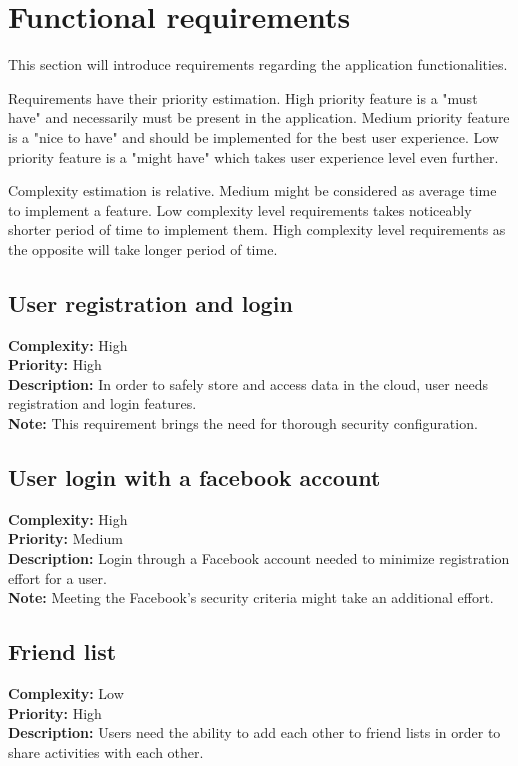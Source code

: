 
\section{Functional requirements}\label{sec:functional-requirements}

This section will introduce requirements regarding the application functionalities.

Requirements have their priority estimation.
High priority feature is a "must have" and necessarily must be present in the application.
Medium priority feature is a "nice to have" and should be implemented for the best user experience.
Low priority feature is a "might have" which takes user experience level even further.

Complexity estimation is relative.
Medium might be considered as average time to implement a feature.
Low complexity level requirements takes noticeably shorter period of time to implement them.
High complexity level requirements as the opposite will take longer period of time.

\subsection{User registration and login}\label{subsec:user-registration-and-login}
\textbf{Complexity:} High\\
\textbf{Priority:} High\\
\textbf{Description:} In order to safely store and access data in the cloud, user needs registration and login features.\\
\textbf{Note:} This requirement brings the need for thorough security configuration.\\


\subsection{User login with a facebook account}\label{subsec:user-login-with-facebook-account}
\textbf{Complexity:} High\\
\textbf{Priority:} Medium\\
\textbf{Description:} Login through a Facebook account needed to minimize registration effort for a user.\\
\textbf{Note:} Meeting the Facebook's security criteria might take an additional effort.\\


\subsection{Friend list}\label{subsec:friend-list}
\textbf{Complexity:} Low\\
\textbf{Priority:} High\\
\textbf{Description:} Users need the ability to add each other to friend lists in order to share activities with each other.\\


